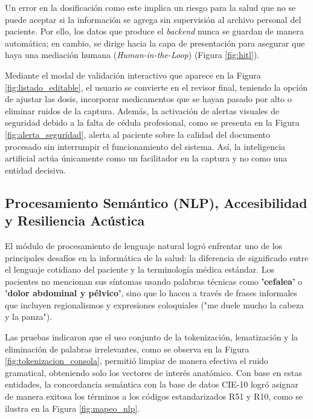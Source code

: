 Un error en la dosificación como este implica un riesgo para la salud que no se puede aceptar si la información se agrega sin supervisión al archivo personal del paciente. Por ello, los datos que produce el \emph{backend} nunca se guardan de manera automática; en cambio, se dirige hacia la capa de presentación para asegurar que haya una mediación humana (\emph{Human-in-the-Loop}) (Figura \ref{fig:hitl}).

Mediante el modal de validación interactivo que aparece en la Figura \ref{fig:listado_editable}, el usuario se convierte en el revisor final, teniendo la opción de ajustar las dosis, incorporar medicamentos que se hayan pasado por alto o eliminar ruidos de la captura. Además, la activación de alertas visuales de seguridad debido a la falta de cédula profesional, como se presenta en la Figura \ref{fig:alerta_seguridad}, alerta al paciente sobre la calidad del documento procesado sin interrumpir el funcionamiento del sistema. Así, la inteligencia artificial actúa únicamente como un facilitador en la captura y no como una entidad decisiva.

\subsection{Procesamiento Semántico (NLP), Accesibilidad y Resiliencia Acústica}
\label{subsec:discusion_nlp}

El módulo de procesamiento de lenguaje natural logró enfrentar uno de los principales desafíos en la informática de la salud: la diferencia de significado entre el lenguaje cotidiano del paciente y la terminología médica estándar. Los pacientes no mencionan sus síntomas usando palabras técnicas como \textbf{'cefalea'} o \textbf{'dolor abdominal y pélvico'}, sino que lo hacen a través de frases informales que incluyen regionalismos y expresiones coloquiales ("me duele mucho la cabeza y la panza").

Las pruebas indicaron que el uso conjunto de la tokenización, lematización y la eliminación de palabras irrelevantes, como se observa en la Figura \ref{fig:tokenizacion_consola}, permitió limpiar de manera efectiva el ruido gramatical, obteniendo solo los vectores de interés anatómico. Con base en estas entidades, la concordancia semántica con la base de datos {CIE-10} logró asignar de manera exitosa los términos a los códigos estandarizados {R51} y {R10}, como se ilustra en la Figura \ref{fig:mapeo_nlp}.


